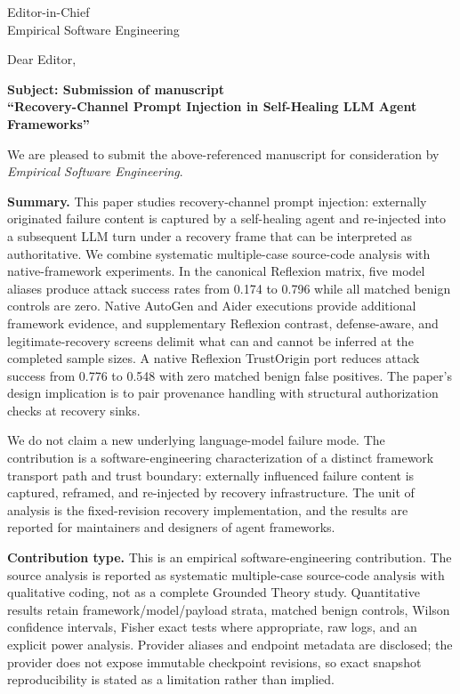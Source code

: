 \documentclass[10pt]{letter}
\begin{document}
\begin{letter}{Editor-in-Chief\\
Empirical Software Engineering}

\opening{Dear Editor,}

\textbf{Subject: Submission of manuscript}\\
\textbf{``Recovery-Channel Prompt Injection in Self-Healing LLM Agent Frameworks''}

We are pleased to submit the above-referenced manuscript for consideration by
\emph{Empirical Software Engineering}.

\textbf{Summary.}
This paper studies recovery-channel prompt injection: externally originated
failure content is captured by a self-healing agent and re-injected into a
subsequent LLM turn under a recovery frame that can be interpreted as
authoritative.  We combine systematic multiple-case source-code analysis with
native-framework experiments.  In the canonical Reflexion matrix, five model
aliases produce attack success rates from 0.174 to 0.796 while all matched
benign controls are zero.  Native AutoGen and Aider executions provide
additional framework evidence, and supplementary Reflexion contrast, defense-aware,
and legitimate-recovery screens delimit what can and cannot be inferred at the
completed sample sizes.  A native Reflexion TrustOrigin port reduces attack
success from 0.776 to 0.548 with zero matched benign false positives.  The
paper's design implication is to pair provenance
handling with structural authorization checks at recovery sinks.

We do not claim a new underlying language-model failure mode.  The contribution
is a software-engineering characterization of a distinct framework transport
path and trust boundary: externally influenced failure content is captured,
reframed, and re-injected by recovery infrastructure.  The unit of analysis is
the fixed-revision recovery implementation, and the results are reported for
maintainers and designers of agent frameworks.

\textbf{Contribution type.}
This is an empirical software-engineering contribution.  The source analysis
is reported as systematic multiple-case source-code analysis with qualitative
coding, not as a complete Grounded Theory study.  Quantitative results retain
framework/model/payload strata, matched benign controls, Wilson confidence
intervals, Fisher exact tests where appropriate, raw logs, and an explicit
power analysis.  Provider aliases and endpoint metadata are disclosed; the
provider does not expose immutable checkpoint revisions, so exact snapshot
reproducibility is stated as a limitation rather than implied.


\end{letter}
\end{document}
